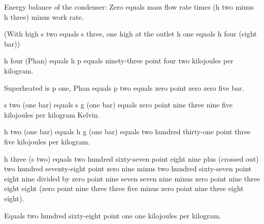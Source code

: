 Energy balance of the condenser:
Zero equals mass flow rate times (h two minus h three) minus work rate.

(With high s two equals s three, one high at the outlet h one equals h four (eight bar))

h four (Phan) equals h p equals ninety-three point four two kilojoules per kilogram.

Superheated is p one, Phan equals p two equals zero point zero zero five bar.

s two (one bar) equals s g (one bar) equals zero point nine three nine five kilojoules per kilogram Kelvin.

h two (one bar) equals h g (one bar) equals two hundred thirty-one point three five kilojoules per kilogram.

h three (s two) equals two hundred sixty-seven point eight nine plus (crossed out) two hundred seventy-eight point zero nine minus two hundred sixty-seven point eight nine divided by zero point nine seven seven nine minus zero point nine three eight eight (zero point nine three three five minus zero point nine three eight eight).

Equals two hundred sixty-eight point one one kilojoules per kilogram.